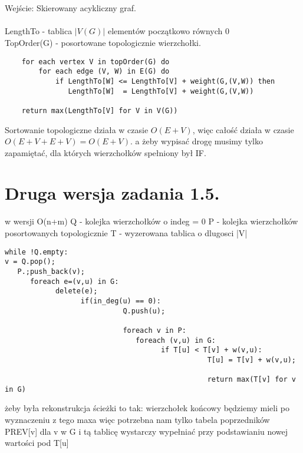 \documentclass[svgnames]{report}
\begin{document}
\section{}%
Wejście: Skierowany acykliczny graf.\\
\\
LengthTo - tablica $|V(G)|$ elementów początkowo równych 0\\
TopOrder(G) - posortowane topologicznie wierzchołki.\\


\begin{lstlisting}
    for each vertex V in topOrder(G) do
        for each edge (V, W) in E(G) do
            if LengthTo[W] <= LengthTo[V] + weight(G,(V,W)) then
               LengthTo[W]  = LengthTo[V] + weight(G,(V,W))
 
    return max(LengthTo[V] for V in V(G))
\end{lstlisting}

Sortowanie topologiczne działa w czasie $O(E+V)$,
więc całość działa w czasie $O(E+V+E+V) = O(E+V)$.
a żeby wypisać drogę musimy tylko zapamiętać, dla których wierzchołków spełniony był IF.

\section{}%
\section{Druga wersja zadania 1.5.}%

 w wersji O(n+m)
Q - kolejka wierzchołków o indeg = 0
P - kolejka wierzchołków posortowanych topologicznie
T - wyzerowana tablica o dlugosci |V|
\begin{lstlisting}
while !Q.empty:
v = Q.pop();
   P.;push_back(v);
      foreach e=(v,u) in G:
            delete(e);
                  if(in_deg(u) == 0):
                            Q.push(u);
                            
                            foreach v in P:
                               foreach (v,u) in G:
                                     if T[u] < T[v] + w(v,u):
                                                T[u] = T[v] + w(v,u);
                                                
                                                return max(T[v] for v in G)
\end{lstlisting}
żeby była rekonstrukcja ścieżki to tak:
wierzchołek końcowy będziemy mieli po wyznaczeniu z tego maxa
więc potrzebna nam tylko tabela poprzedników PREV[v] dla v w G
i tą tablicę wystarczy wypełniać przy podstawianiu nowej wartości pod T[u]
\end{document}
